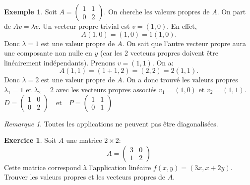 \documentclass[11pt,a4paper]{article}
\numberwithin{equation}{section}
\theoremstyle{plain}
\theoremstyle{definition}
\newtheorem{example}[theorem]{Exemple}
\newtheorem{exercise}[theorem]{Exercice}
\theoremstyle{remark}
\newtheorem*{remark}{Remarque}
\begin{document}
\begin{example} \label{ex:diag}
    Soit \(A = \begin{pmatrix}
        1 & 1 \\
        0 & 2
    \end{pmatrix}\). On cherche les valeurs propres de $A$.
    On part de $A v = \lambda v$. Un vecteur propre trivial est $v = (1, 0)$. En effet,
    \[
        A(1, 0) = (1, 0) = 1(1, 0).
    \]
    Donc $\lambda = 1$ est une valeur propre de $A$.
    On sait que l'autre vecteur propre aura une composante non nulle en $y$ (car les 2 vecteurs propres doivent être linéairement indépendants).
    Prenons $v = (1, 1)$. On a:
    \[
        A(1, 1) = (1 + 1, 2) = (2, 2) = 2(1, 1).
    \]
    Donc $\lambda = 2$ est une valeur propre de $A$.
    On a donc trouvé les valeurs propres $\lambda_1 = 1$ et $\lambda_2 = 2$ avec les vecteurs propres associés $v_1 = (1, 0)$ et $v_2 = (1, 1)$.
    \(
        D = \begin{pmatrix}
            1 & 0 \\
            0 & 2
        \end{pmatrix}
        \quad \text{et} \quad
        P = \begin{pmatrix}
            1 & 1 \\
            0 & 1
        \end{pmatrix}
    \)
\end{example}

\begin{remark}
    Toutes les applications ne peuvent pas être diagonalisées.
\end{remark}

\begin{exercise}
    Soit \(A\) une matrice \(2 \times 2\):
    \[
        A = \begin{pmatrix}
            3 & 0 \\
            1 & 2
        \end{pmatrix}
    \]
    Cette matrice correspond à l'application linéaire $f(x,y) = (3x, x + 2y)$.
    Trouver les valeurs propres et les vecteurs propres de \(A\).
\end{exercise}
\end{document}

